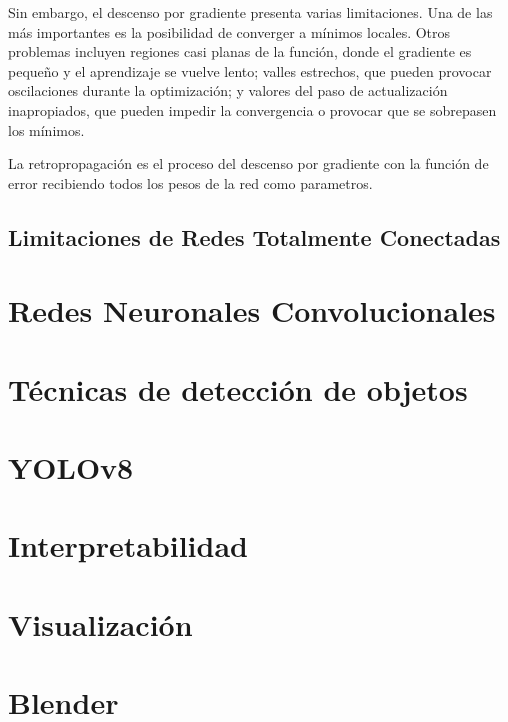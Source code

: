 Sin embargo, el descenso por gradiente presenta varias limitaciones. Una de las más
importantes es la posibilidad de converger a mínimos locales. Otros problemas incluyen
regiones casi planas de la función, donde el gradiente es pequeño y el aprendizaje se
vuelve lento; valles estrechos, que pueden provocar oscilaciones durante la optimización;
y valores del paso de actualización inapropiados, que pueden impedir la convergencia o
provocar que se sobrepasen los mínimos.
\medskip

La retropropagación es el proceso del descenso por gradiente con la función de error
recibiendo todos los pesos de la red como parametros.
\medskip




\subsection{Limitaciones de Redes Totalmente Conectadas}

\section{Redes Neuronales Convolucionales}
\section{Técnicas de detección de objetos}
\section{YOLOv8}
\section{Interpretabilidad}
\section{Visualización}
\section{Blender}